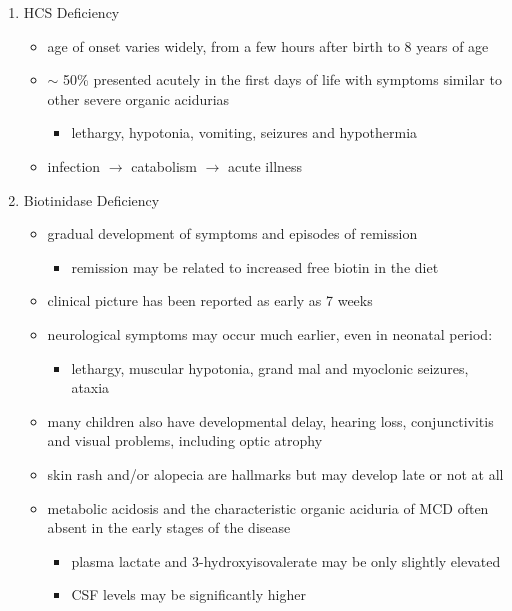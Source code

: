\documentclass{scrartcl}
\begin{document}
\begin{enumerate}
\item HCS Deficiency
\label{sec:org1c611fc}
\begin{itemize}
\item age of onset varies widely, from a few hours after birth to 8 years
of age
\item \(\sim\) 50\% presented acutely in the first days of life with symptoms
similar to other severe organic acidurias
\begin{itemize}
\item lethargy, hypotonia, vomiting, seizures and hypothermia
\end{itemize}
\item infection \(\to\) catabolism \(\to\) acute illness
\end{itemize}

\item Biotinidase Deficiency
\label{sec:org7f309ce}
\begin{itemize}
\item gradual development of symptoms and episodes of remission
\begin{itemize}
\item remission may be related to increased free biotin in the diet
\end{itemize}
\item clinical picture has been reported as early as 7 weeks
\item neurological symptoms may occur much earlier, even in neonatal period:
\begin{itemize}
\item lethargy, muscular hypotonia, grand mal and myoclonic seizures, ataxia
\end{itemize}
\item many children also have developmental delay, hearing loss,
conjunctivitis and visual problems, including optic atrophy
\item skin rash and/or alopecia are hallmarks but may develop late or not
at all
\item metabolic acidosis and the characteristic organic aciduria of MCD
often absent in the early stages of the disease
\begin{itemize}
\item plasma lactate and 3-hydroxyisovalerate may be only slightly
elevated
\item CSF levels may be significantly higher
\end{itemize}
\end{itemize}
\end{enumerate}
\end{document}
